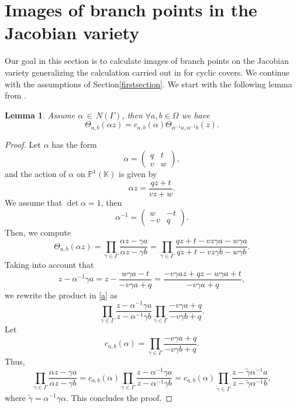 \documentclass[]{amsart}
\numberwithin{equation}{section}
\newtheorem{lemma}[theorem]{Lemma}
\begin{document}
\section{Images of branch points  in the Jacobian variety} 
Our goal in this section is to calculate images of  branch points  
on the Jacobian variety generalizing the calculation carried out in \cite{V1,V2} for cyclic covers. 
We continue with the assumptions of Section\;\ref{firstsection}.
We start with the following lemma from \cite{V2}.
\begin{lemma}\label{L:Theta}
Assume $\alpha \,{\in}\, N(\Gamma)$, then $\forall a,b\in \Omega$  we have
$$\Theta_{a,b}(\alpha z)=c_{a,b}(\alpha)\Theta_{\alpha^{-1}a,\alpha^{-1}b}(z).$$
\end{lemma}
\begin{proof} Let $\alpha$ has the form
$$\alpha=
   \begin{pmatrix} 
      q & t \\ 
      v & w 
   \end{pmatrix},
$$
and the action of $\alpha$ on  $\mathbb{P}^{1}(\mathbb{K})$ is given by
$$ \alpha z = \frac{qz+t}{vz+w}.$$
We assume that $\det\alpha=1$, then 
$$\alpha^{-1}=
   \begin{pmatrix} 
      w & -t \\ 
      -v & q 
   \end{pmatrix}.
$$
Then, we compute
\begin{equation} \label{a}
\Theta_{a,b}(\alpha z)=\prod_{\gamma \in \Gamma}\frac{\alpha z - \gamma a}{\alpha z- \gamma b}
= \prod_{\gamma \in \Gamma}\frac{qz+t - vz\gamma a - w\gamma a}{qz+t - vz \gamma b - w\gamma b }.
\end{equation}   
Taking into account that
$$z-\alpha^{-1}\gamma a = z - \frac{w\gamma a-t}{-v\gamma a+q}
=\frac{-v\gamma a z + qz - w\gamma a+t}{-v\gamma a+q},$$ 
we rewrite   the product in \eqref{a} as 
\begin{equation}
\prod_{\gamma \in \Gamma}\frac{z-\alpha^{-1}\gamma a }{z-\alpha^{-1} \gamma b }
\prod_{\gamma \in \Gamma}\frac{-v\gamma a+q}{-v\gamma b+q}.
\end{equation}
Let
\begin{equation}\label{cabDef}
c_{a,b}(\alpha) = \prod_{\gamma \in \Gamma} \frac{-v\gamma a+q}{-v\gamma b+q}.
\end{equation}  
Thus,  
$$\prod_{\gamma \in \Gamma} \frac{\alpha z -\gamma a}{\alpha z -\gamma b}
= c_{a,b}(\alpha) \prod_{\gamma \in \Gamma}
\frac{z-\alpha^{-1}\gamma a }{z-\alpha^{-1} \gamma b }
= c_{a,b}(\alpha) \prod_{\tilde{\gamma} \in \Gamma}
\frac{z - \tilde{\gamma} \alpha^{-1} a }{z - \tilde{\gamma} \alpha^{-1}  b },$$  
where $\tilde{\gamma} = \alpha^{-1}\gamma \alpha$.
This concludes the proof. 
 \end{proof}
\end{document}
